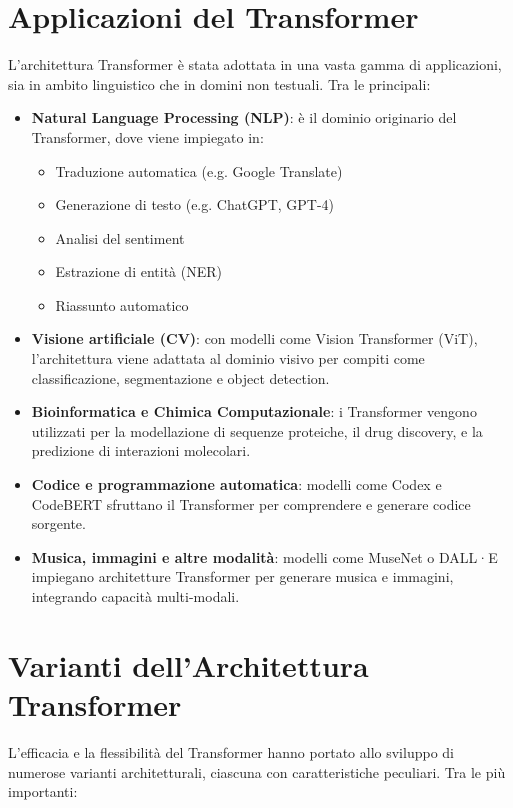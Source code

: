 \section{Applicazioni del Transformer}

L'architettura Transformer è stata adottata in una vasta gamma di applicazioni, sia in ambito linguistico che in domini non testuali. Tra le principali:

\begin{itemize}
    \item \textbf{Natural Language Processing (NLP)}: è il dominio originario del Transformer, dove viene impiegato in:
    \begin{itemize}
        \item Traduzione automatica (e.g. Google Translate)
        \item Generazione di testo (e.g. ChatGPT, GPT-4)
        \item Analisi del sentiment
        \item Estrazione di entità (NER)
        \item Riassunto automatico
    \end{itemize}
    \item \textbf{Visione artificiale (CV)}: con modelli come Vision Transformer (ViT), l'architettura viene adattata al dominio visivo per compiti come classificazione, segmentazione e object detection.\item \textbf{Bioinformatica e Chimica Computazionale}: i Transformer vengono utilizzati per la modellazione di sequenze proteiche, il drug discovery, e la predizione di interazioni molecolari.
    \item \textbf{Codice e programmazione automatica}: modelli come Codex e CodeBERT sfruttano il Transformer per comprendere e generare codice sorgente.
    \item \textbf{Musica, immagini e altre modalità}: modelli come MuseNet o DALL·E impiegano architetture Transformer per generare musica e immagini, integrando capacità multi-modali.
\end{itemize}

\section{Varianti dell'Architettura Transformer}

L'efficacia e la flessibilità del Transformer hanno portato allo sviluppo di numerose varianti architetturali, ciascuna con caratteristiche peculiari. Tra le più importanti:

